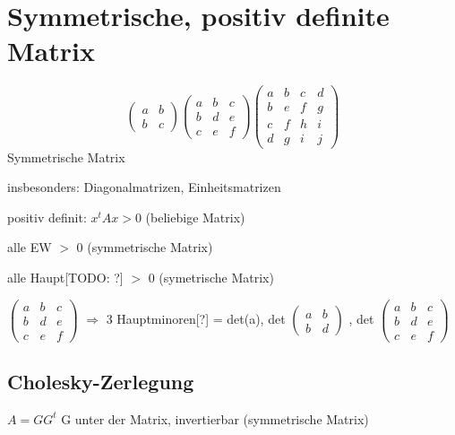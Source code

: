 \documentclass[12pt,a4paper]{article} %
\begin{document}
	\newpage
	
	\section{Symmetrische, positiv definite Matrix}
	
	\begin{equation*}
		\begin{pmatrix}
			a & b \\
			b & c 
		\end{pmatrix}
		\begin{pmatrix}
			a & b & c \\
			b & d & e \\
			c & e & f
		\end{pmatrix}
		\begin{pmatrix}
			a & b & c & d \\
			b & e & f & g \\
			c & f & h & i \\
			d & g & i & j
		\end{pmatrix}
	\end{equation*}
	Symmetrische Matrix
	
	
	insbesonders: Diagonalmatrizen, Einheitsmatrizen
	
	positiv definit: $x^t Ax > 0$ (beliebige Matrix)
	
	alle EW $>$ 0 (symmetrische Matrix)
	
	alle Haupt[TODO: ?] $>$ 0 (symetrische Matrix)
	
	$\begin{pmatrix}
		a & b & c \\
		b & d & e \\
		c & e & f
	\end{pmatrix}$
 	$\Rightarrow$ 3 Hauptminoren[?] = det(a), det
 	$\begin{pmatrix}
	 	a & b \\
	 	b & d 
 	\end{pmatrix}$
 	, det
 	$\begin{pmatrix}
 	a & b & c \\
 	b & d & e \\
 	c & e & f
 	\end{pmatrix}$
	
	\subsection{Cholesky-Zerlegung}
	$A = GG^t$ G unter der Matrix, invertierbar (symmetrische Matrix)
	
\end{document}
